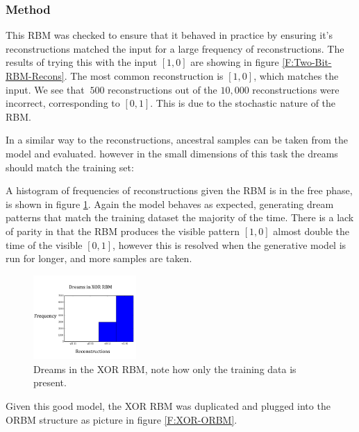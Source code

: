 \subsubsection{Method}

This RBM was checked to ensure that it behaved in practice by ensuring it's reconstructions matched the input for a large frequency of reconstructions. The results of trying this with the input $[1,0]$ are showing in figure \ref{F:Two-Bit-RBM-Recons}. The most common reconstruction is  $[1,0]$, which matches the input. We see that $~500$ reconstructions out of the $10,000$ reconstructions were incorrect, corresponding to $[0,1]$. This is due to the stochastic nature of the RBM.



In a similar way to the reconstructions, ancestral samples can be taken from the model and evaluated.  however in the small dimensions of this task the dreams should match the training set:

A histogram of frequencies of reconstructions given the RBM is in the free phase, is shown in figure \ref{F:Two-Bit-RBM-Dreams}. Again the model behaves as expected, generating dream patterns that match the training dataset the majority of the time. There is a lack of parity in that the RBM produces the visible pattern $[1,0]$ almost double the time of the visible $[0,1]$, however this is resolved when the generative model is run for longer, and more samples are taken.


\begin{figure}
  \begin{center}
    \includegraphics[width=0.35\textwidth]{Assets/XOR-RBM-Dreams.png}
  \end{center}
  \caption{Dreams in the XOR RBM, note how only the training data is present.}
  \label{F:Two-Bit-RBM-Dreams}
\end{figure}


Given this good model, the XOR RBM was duplicated and plugged into the ORBM structure as picture in figure \ref{F:XOR-ORBM}.


